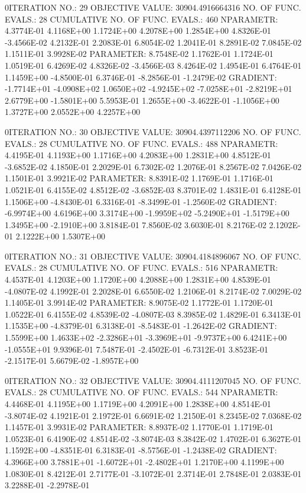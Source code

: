 \documentclass[
  letterpaper,
  toc=chapterentrywithdots,
  listof=totoc,
  11pt,
  headings=small,
  usegeometry]{scrreprt}
\begin{document}
\begin{nonmemlisting}
0ITERATION NO.:   29    OBJECTIVE VALUE:   30904.4916664316        NO. OF FUNC. EVALS.:  28
 CUMULATIVE NO. OF FUNC. EVALS.:      460
 NPARAMETR:  4.3774E-01  4.1168E+00  1.1724E+00  4.2078E+00  1.2854E+00  4.8326E-01 -3.4566E-02  4.2132E-01  2.2083E-01  6.8054E-02
             1.2041E-01  8.2891E-02  7.0845E-02  1.1511E-01  3.9928E-02
 PARAMETER:  8.7548E-02  1.1762E-01  1.1724E-01  1.0519E-01  6.4269E-02  4.8326E-02 -3.4566E-03  8.4264E-02  1.4954E-01  6.4764E-01
             1.1459E+00 -4.8500E-01  6.3746E-01 -8.2856E-01 -1.2479E-02
 GRADIENT:  -1.7714E+01 -4.0908E+02  1.0650E+02 -4.9245E+02 -7.0258E+01 -2.8219E+01  2.6779E+00 -1.5801E+00  5.5953E-01  1.2655E+00
            -3.4622E-01 -1.1056E+00  1.3727E+00  2.0552E+00  4.2257E+00

0ITERATION NO.:   30    OBJECTIVE VALUE:   30904.4397112206        NO. OF FUNC. EVALS.:  28
 CUMULATIVE NO. OF FUNC. EVALS.:      488
 NPARAMETR:  4.4195E-01  4.1193E+00  1.1716E+00  4.2083E+00  1.2831E+00  4.8512E-01 -3.6852E-02  4.1850E-01  2.2029E-01  6.7302E-02
             1.2076E-01  8.2567E-02  7.0426E-02  1.1501E-01  3.9921E-02
 PARAMETER:  8.8391E-02  1.1769E-01  1.1716E-01  1.0521E-01  6.4155E-02  4.8512E-02 -3.6852E-03  8.3701E-02  1.4831E-01  6.4128E-01
             1.1506E+00 -4.8430E-01  6.3316E-01 -8.3499E-01 -1.2560E-02
 GRADIENT:  -6.9974E+00  4.6196E+00  3.3174E+00 -1.9959E+02 -5.2490E+01 -1.5179E+00  1.3495E+00 -2.1910E+00  3.8184E-01  7.8560E-02
             3.6030E-01  8.2176E-02  2.1202E-01  2.1222E+00  1.5307E+00

0ITERATION NO.:   31    OBJECTIVE VALUE:   30904.4184896067        NO. OF FUNC. EVALS.:  28
 CUMULATIVE NO. OF FUNC. EVALS.:      516
 NPARAMETR:  4.4537E-01  4.1203E+00  1.1720E+00  4.2088E+00  1.2831E+00  4.8539E-01 -4.0807E-02  4.1992E-01  2.2028E-01  6.6550E-02
             1.2106E-01  8.2174E-02  7.0029E-02  1.1405E-01  3.9914E-02
 PARAMETER:  8.9075E-02  1.1772E-01  1.1720E-01  1.0522E-01  6.4155E-02  4.8539E-02 -4.0807E-03  8.3985E-02  1.4829E-01  6.3413E-01
             1.1535E+00 -4.8379E-01  6.3138E-01 -8.5483E-01 -1.2642E-02
 GRADIENT:   1.5599E+00  1.4633E+02 -2.3286E+01 -3.3969E+01 -9.9737E+00  6.4241E+00 -1.0555E+01  9.9396E-01  7.5487E-01 -2.4502E-01
            -6.7312E-01  3.8523E-01 -2.1517E-01  5.6679E-02 -1.8957E+00

0ITERATION NO.:   32    OBJECTIVE VALUE:   30904.4111207045        NO. OF FUNC. EVALS.:  28
 CUMULATIVE NO. OF FUNC. EVALS.:      544
 NPARAMETR:  4.4468E-01  4.1195E+00  1.1719E+00  4.2091E+00  1.2838E+00  4.8514E-01 -3.8074E-02  4.1921E-01  2.1972E-01  6.6691E-02
             1.2150E-01  8.2345E-02  7.0368E-02  1.1457E-01  3.9931E-02
 PARAMETER:  8.8937E-02  1.1770E-01  1.1719E-01  1.0523E-01  6.4190E-02  4.8514E-02 -3.8074E-03  8.3842E-02  1.4702E-01  6.3627E-01
             1.1592E+00 -4.8351E-01  6.3183E-01 -8.5756E-01 -1.2438E-02
 GRADIENT:   4.3966E+00  3.7881E+01 -1.6072E+01 -2.4802E+01  1.2170E+00  4.1199E+00  1.0830E-01  8.4212E-01  2.7177E-01 -3.1072E-01
             2.3714E-01  2.7848E-01  2.0383E-01  3.2288E-01 -2.2978E-01


\end{nonmemlisting}
\end{document}
